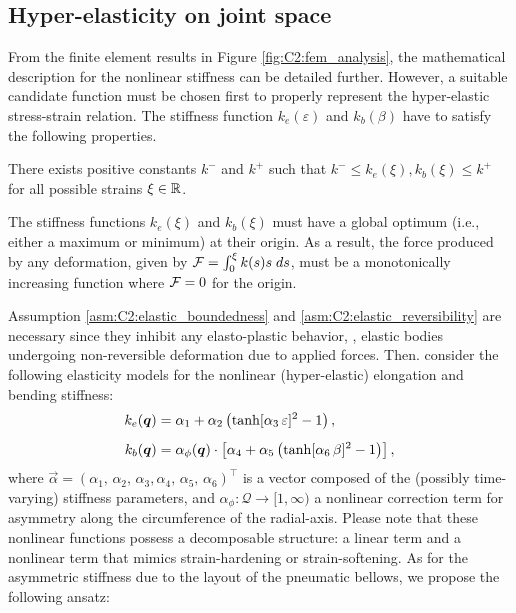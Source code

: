 \subsection{Hyper-elasticity on joint space}
\noindent From the finite element results in Figure \ref{fig:C2:fem_analysis}, the mathematical description for the nonlinear stiffness can be detailed further. However, a suitable candidate function must be chosen first to properly represent the hyper-elastic stress-strain relation. The stiffness function $k_e (\varepsilon)$ and $k_b (\beta)$  have to satisfy the following properties.
%
\begin{asm}
\label{asm:C2:elastic_boundedness}
There exists positive constants ${k}^{-}$ and ${k}^{+}$ such that ${k}^{-} \le k_e(\xi),k_b(\xi) \le {k}^{+}$ for all possible strains $\xi \in \mathbb{R}$.
\end{asm}
%
\begin{asm}
\label{asm:C2:elastic_reversibility}
The stiffness functions $k_e(\xi)$ and $k_b(\xi)$ must have a global optimum (i.e., either a maximum or minimum) at their origin. As a result, the force produced by any deformation, given by ${\mathcal{F}} = \int_0^\xi k(s)s\;ds$, must be a monotonically increasing function where $\mathcal{F} = 0$ for the origin.
\end{asm}
%
Assumption \ref{asm:C2:elastic_boundedness} and \ref{asm:C2:elastic_reversibility} are necessary since they inhibit any elasto-plastic behavior, \ie, elastic bodies undergoing non-reversible deformation due to applied forces. Then. consider the following elasticity models for the nonlinear (hyper-elastic) elongation and bending stiffness:
%
\begin{align}
\label{eq:C2:stiffness_tanh_eps}
{k}_e({\boldsymbol{q}}) & = \alpha_1 + \alpha_2 \left( \tanh[\alpha_3\,\varepsilon]^2 - 1 \right), \\[0.5em]
\label{eq:C2:stiffness_tanh_beta}
{k}_b({\boldsymbol{q}})  & = \alpha_{\phi}({\boldsymbol{q}}) \cdot \left[\alpha_4 + \alpha_5 \left( \tanh[\alpha_6\,\beta]^2 - 1 \right)\right],
\end{align}
%
where $\vec{\alpha} = \left(\alpha_1,\,\alpha_2,\,\alpha_3,\alpha_4,\,\alpha_5,\,\alpha_6 \right)^\top$ is a vector composed of the (possibly time-varying) stiffness parameters, and $\alpha_\phi: \mathcal{Q} \to [1,\infty)$ a nonlinear correction term for asymmetry along the circumference of the radial-axis. Please note that these nonlinear functions possess a decomposable structure: a linear term and a nonlinear term that mimics strain-hardening or strain-softening. As for the asymmetric stiffness due to the layout of the pneumatic bellows, we propose the following ansatz:
